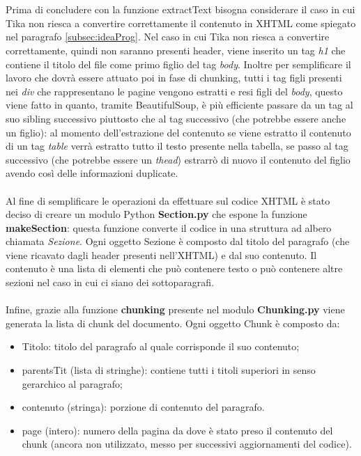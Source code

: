 \\\\Prima di concludere con la funzione extractText bisogna considerare il caso in cui Tika non riesca a convertire correttamente il contenuto in XHTML come spiegato nel paragrafo \ref{subsec:ideaProg}.
Nel caso in cui Tika non riesca a convertire correttamente, quindi non saranno presenti header, viene inserito un tag \emph{h1} che contiene il titolo del file come primo figlio del tag \emph{body}.
Inoltre per semplificare il lavoro che dovrà essere attuato poi in fase di chunking, tutti i tag figli presenti nei \emph{div} che rappresentano le pagine vengono estratti e resi figli del \emph{body}, questo viene fatto in quanto, tramite BeautifulSoup, è più efficiente passare da un tag al suo sibling successivo piuttosto che al tag successivo (che potrebbe essere anche un figlio): al momento dell'estrazione del contenuto se viene estratto il contenuto di un tag \emph{table} verrà estratto tutto il testo presente nella tabella, se passo al tag successivo (che potrebbe essere un \emph{thead}) estrarrò di nuovo il contenuto del figlio avendo così delle informazioni duplicate.
\\\\Al fine di semplificare le operazioni da effettuare sul codice XHTML è stato deciso di creare un modulo Python \textbf{Section.py} che espone la funzione \textbf{makeSection}: questa funzione converte il codice in una struttura ad albero chiamata \emph{Sezione}.
Ogni oggetto Sezione è composto dal titolo del paragrafo (che viene ricavato dagli header presenti nell'XHTML) e dal suo contenuto. Il contenuto è una lista di elementi che può contenere testo o può contenere altre sezioni nel caso in cui ci siano dei sottoparagrafi.
\\\\Infine, grazie alla funzione \textbf{chunking} presente nel modulo \textbf{Chunking.py} viene generata la lista di chunk del documento.
Ogni oggetto Chunk è composto da:
\begin{itemize}
    \item Titolo: titolo del paragrafo al quale corrisponde il suo contenuto;
    \item parentsTit (lista di stringhe): contiene tutti i titoli superiori in senso gerarchico al paragrafo;
    \item contenuto (stringa): porzione di contenuto del paragrafo.
    \item page (intero): numero della pagina da dove è stato preso il contenuto del chunk (ancora non utilizzato, messo per successivi aggiornamenti del codice). 
\end{itemize}

